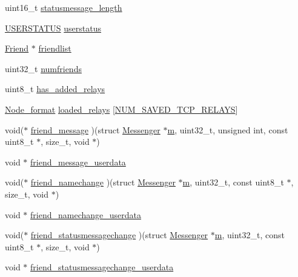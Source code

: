 \begin{DoxyCompactItemize}
uint16\+\_\+t \hyperlink{struct_messenger_a43fe9dde52dc12e90933150eca91c0c3}{statusmessage\+\_\+length}
\item 
\hyperlink{_messenger_8h_aa55a7166581c83a07f49f9392447986c}{U\+S\+E\+R\+S\+T\+A\+T\+U\+S} \hyperlink{struct_messenger_adde524f5a15465585cbc2543cd0b2710}{userstatus}
\item 
\hyperlink{struct_friend}{Friend} $\ast$ \hyperlink{struct_messenger_a42c185c16c5df7707ba4d70bb6ee75e7}{friendlist}
\item 
uint32\+\_\+t \hyperlink{struct_messenger_a476f4b36bd078632dd434e76df29d922}{numfriends}
\item 
uint8\+\_\+t \hyperlink{struct_messenger_af97bc78d4a1b6b87167a479a1cb9920c}{has\+\_\+added\+\_\+relays}
\item 
\hyperlink{struct_node__format}{Node\+\_\+format} \hyperlink{struct_messenger_a75d4e8cfc84896f1684dd7c62c1be397}{loaded\+\_\+relays} \mbox{[}\hyperlink{_messenger_8h_a7b9306b33798fe1ba98b6f04de976866}{N\+U\+M\+\_\+\+S\+A\+V\+E\+D\+\_\+\+T\+C\+P\+\_\+\+R\+E\+L\+A\+Y\+S}\mbox{]}
\item 
void($\ast$ \hyperlink{struct_messenger_a85d35646398022de4e435174f990ce18}{friend\+\_\+message} )(struct \hyperlink{struct_messenger}{Messenger} $\ast$\hyperlink{_messenger__test_8c_aea6eb6c7c30a659f1b0dee83eaf03ea2}{m}, uint32\+\_\+t, unsigned int, const uint8\+\_\+t $\ast$, size\+\_\+t, void $\ast$)
\item 
void $\ast$ \hyperlink{struct_messenger_a2b0701803305a0b99a2d3f016300b900}{friend\+\_\+message\+\_\+userdata}
\item 
void($\ast$ \hyperlink{struct_messenger_a108f796a6b45966363b7bd8a64f366f8}{friend\+\_\+namechange} )(struct \hyperlink{struct_messenger}{Messenger} $\ast$\hyperlink{_messenger__test_8c_aea6eb6c7c30a659f1b0dee83eaf03ea2}{m}, uint32\+\_\+t, const uint8\+\_\+t $\ast$, size\+\_\+t, void $\ast$)
\item 
void $\ast$ \hyperlink{struct_messenger_a0a5f95c8ffcd6a9a0dafd21c34be2e0a}{friend\+\_\+namechange\+\_\+userdata}
\item 
void($\ast$ \hyperlink{struct_messenger_a5badb1433338f70899baee5abcf5f0a5}{friend\+\_\+statusmessagechange} )(struct \hyperlink{struct_messenger}{Messenger} $\ast$\hyperlink{_messenger__test_8c_aea6eb6c7c30a659f1b0dee83eaf03ea2}{m}, uint32\+\_\+t, const uint8\+\_\+t $\ast$, size\+\_\+t, void $\ast$)
\item 
void $\ast$ \hyperlink{struct_messenger_adeec8efd452cd609070c2eee12826fb9}{friend\+\_\+statusmessagechange\+\_\+userdata}

\end{DoxyCompactItemize}
